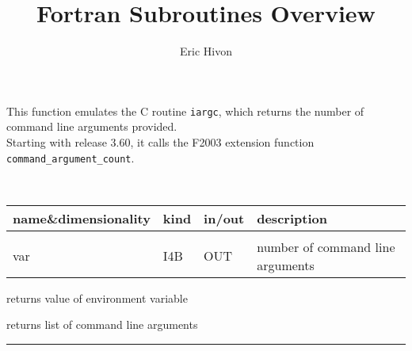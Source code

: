 \sloppy

\title{\healpix Fortran Subroutines Overview}
 \section[nArguments]{ }
\label{sub:narguments}
\author{Eric Hivon}

\begin{facility}
{This function emulates the C routine {\tt iargc}, which returns the number of
command line arguments provided.\\
Starting with release 3.60, it calls the F2003 extension function \texttt{command\_argument\_count}.}
{\modExtension}
\end{facility}

\begin{f90function}
{\ }
\end{f90function}

\begin{arguments}
{
\begin{tabular}{p{0.3\hsize} p{0.05\hsize} p{0.1\hsize} p{0.45\hsize}} \hline  
\textbf{name\&dimensionality} & \textbf{kind} & \textbf{in/out} & \textbf{description} \\ \hline
                   &   &   &                           \\ %
var & I4B & OUT & number of command line arguments

\end{tabular}}
\end{arguments}


\begin{related}
  \begin{sulist}{} %
  \item[\htmlref{getEnvironment}{sub:getenvironment}] returns value of
  environment variable
  \item[\htmlref{getArgument}{sub:getargument}] returns list of command line arguments
  \end{sulist}
\end{related}

\rule{\hsize}{2mm}

\newpage
